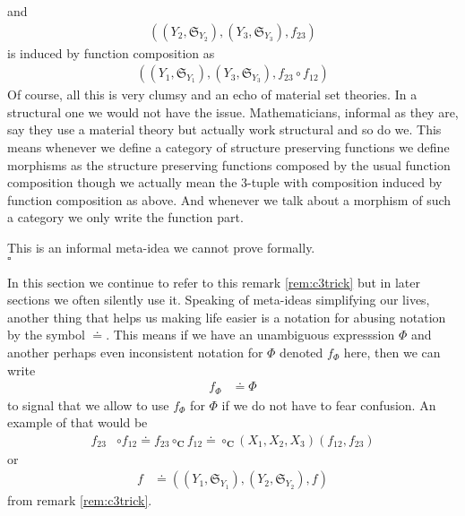 \begin{rem}[(C3) Trick]
and
\begin{align*}
  \left(
    (Y_{2},\mathfrak{S}_{Y_{2}}),
    (Y_{3},\mathfrak{S}_{Y_{3}}),
    f_{23}
  \right)
\end{align*}
is induced by function composition as
\begin{align*}
  \left(
    (Y_{1},\mathfrak{S}_{Y_{1}}),
    (Y_{3},\mathfrak{S}_{Y_{3}}),
    f_{23}
    \circ
    f_{12}
  \right)
\end{align*}
Of course, all this is very clumsy and an echo of material set theories. In a structural one we would not have the issue. Mathematicians, informal as they are, say they use a material theory but actually work structural and so do we. This means whenever we define a category of structure preserving functions we define morphisms as the structure preserving functions composed by the usual function composition though we actually mean the $3$-tuple with composition induced by function composition as above. And whenever we talk about a morphism of such a category we only write the function part.
\end{rem}
\begin{prf}
This is an informal meta-idea we cannot prove formally.
\\
\phantom{proven}
\hfill
$\square$
\end{prf}
In this section we continue to refer to this remark \ref{rem:c3trick} but in later sections we often silently use it. Speaking of meta-ideas simplifying our lives, another thing that helps us making life easier is a notation for {\glqq}abusing notation{\grqq} by the symbol $\doteq$. This means if we have an unambiguous expresssion $\Phi$ and another perhaps even inconsistent notation for $\Phi$ denoted $f_{\Phi}$ here, then we can write
\begin{align*}
  f_{\Phi}
  &\doteq
  \Phi
\end{align*}
to signal that we allow to use $f_{\Phi}$ for $\Phi$ if we do not have to fear confusion. An example of that would be
\begin{align*}
  f_{23}
  &\circ
  f_{12}
  \doteq
  f_{23}
  \circ_{\mathbf{C}}
  f_{12}
  \doteq
  \circ_{\mathbf{C}}(X_{1},X_{2},X_{3})(f_{12},f_{23})
\end{align*}
or
\begin{align*}
  f
  &\doteq
  \left(
    (Y_{1},\mathfrak{S}_{Y_{1}}),
    (Y_{2},\mathfrak{S}_{Y_{2}}),
    f
  \right)
\end{align*}
from remark \ref{rem:c3trick}.
\\\\
